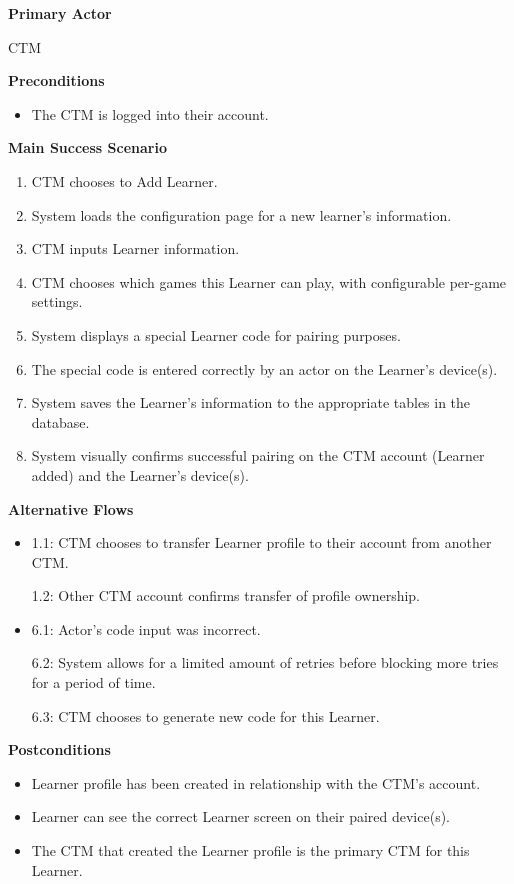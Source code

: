 \documentclass[12pt]{article}
\begin{document}
\textbf{Primary Actor}

CTM

\textbf{Preconditions}
\begin{itemize}
\item The CTM is logged into their account.
\end{itemize}

\textbf{Main Success Scenario}
\begin{enumerate}
\item CTM chooses to Add Learner.
\item System loads the configuration page for a new learner's information.
\item CTM inputs Learner information.
\item CTM chooses which games this Learner can play, with configurable per-game settings.
\item System displays a special Learner code for pairing purposes.
\item The special code is entered correctly by an actor on the Learner's device(s).
\item System saves the Learner's information to the appropriate tables in the database.
\item System visually confirms successful pairing on the CTM account (Learner added) and the Learner's device(s).
\end{enumerate}

\textbf{Alternative Flows}
\begin{itemize}
\item 1.1: CTM chooses to transfer Learner profile to their account from another CTM.

1.2: Other CTM account confirms transfer of profile ownership.

\item 6.1: Actor's code input was incorrect.

6.2: System allows for a limited amount of retries before blocking more tries for a period of time.

6.3: CTM chooses to generate new code for this Learner.

\end{itemize}

\textbf{Postconditions}
\begin{itemize}
\item Learner profile has been created in relationship with the CTM's account.
\item Learner can see the correct Learner screen on their paired device(s).
\item The CTM that created the Learner profile is the primary CTM for this Learner.
\end{itemize}
\end{document}
